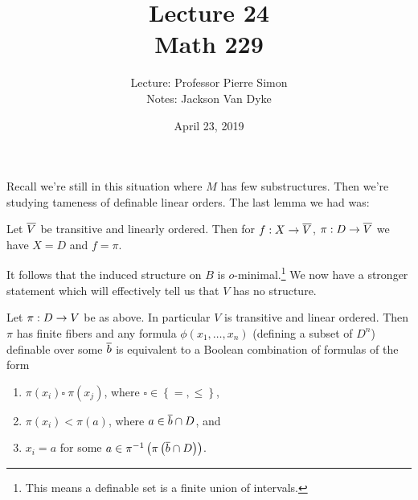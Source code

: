 \documentclass{amsart}
\begin{document}
\title{Lecture 24\\ Math 229}
\author{Lecture: Professor Pierre Simon\\ Notes: Jackson Van Dyke}
\date{April 23, 2019}
\maketitle

Recall we're still in this situation where $M$ has few substructures.
Then we're studying tameness of definable linear orders.
The last lemma we had was:

\begin{lem}
Let $\overline{V}$ be transitive and linearly ordered. Then
for $f: X\rightarrow \overline{V}$, $\pi: D\rightarrow \overline{V}$
we have $X = D$ and $f = \pi$.
\end{lem}

It follows that the induced structure on $B$ is $o$-minimal.\footnote{This means a
definable set is a finite union of intervals.}
We now have a stronger statement which will effectively tell us that $V$ has no
structure.

\begin{prop}
Let $\pi : D\rightarrow V$ be as above. In particular $V$ is transitive and linear ordered. 
Then $\pi$ has finite fibers and any formula $\phi\left(x_1 , \ldots , x_n\right)$
(defining a subset of $D^n$)
definable over some $\overline{b}$ is equivalent to a Boolean combination of formulas of the
form
\begin{enumerate}[label = (\abc)]
\item $\pi\left(x_i\right)\square\ \pi\left(x_j\right)$, where $\square \in \left\{= ,
\leq\right\}$,
\item $\pi\left(x_i\right) < \pi\left(a\right)$, where $a\in \overline{b}\cap D$, and
\item $x_i = a$ for some $a\in \pi^{-1} \left(\pi\left(\overline{b}\cap D\right)\right)$.
\end{enumerate}
\label{prop:linear}
\end{prop}
\end{document}
